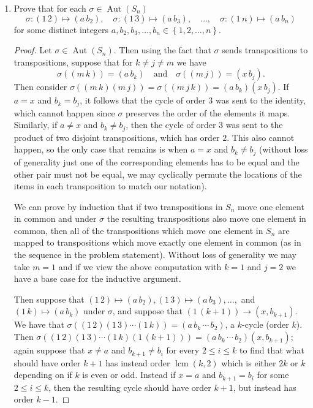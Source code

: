 \documentclass[11pt]{article}
\newcommand{\cbr}[1]{\left\{#1\right\}}
\DeclareMathOperator\Aut{Aut}
\DeclareMathOperator{\lcm}{lcm}
\begin{document}
\begin{enumerate}
\begin{enumerate}[label=(\alph*)]
\begin{proof}
        Thus for $2\leq n \neq 6$, $\abs{\mathcal{K}}\neq \abs{\mathcal{K}^{\prime}}$.

        By (a) any automorphism of $S_n$ must induce a mapping from $\mathcal{K}$ onto a conjugacy class whose elements have order $2$, but because $\abs{\mathcal{K}}\neq \abs{\mathcal{K}^{\prime}}$ for $2\leq n\neq 6$ we have that any automorphism of $S_n$ sends $\mathcal{K}$ to itself; that is, it sends transpositions to transpositions.
      \end{proof}
      \item Prove that for each $\sigma\in \Aut(S_n)$ \[\sigma\colon (1\, 2)\mapsto (a\, b_2), \quad\sigma\colon (1\, 3)\mapsto (a\, b_3), \quad\dots,\quad \sigma\colon (1\, n)\mapsto (a\, b_n)\]
      for some distinct integers $a, b_2, b_3, \dots, b_n\in \cbr{1, 2, \dots, n}$.
      \begin{proof}
        Let $\sigma\in \Aut(S_n)$. Then using the fact that $\sigma$ sends transpositions to transpositions, suppose that for $k \neq j \neq m$ we have \[\sigma((m\, k)) = (a \, b_k)\quad \text{and}\quad \sigma((m\, j)) = (x\, b_j).\] Then consider $\sigma((m\, k)(m\, j)) = \sigma((m\, j \, k)) = (a \, b_k)(x\, b_j)$. If $a = x$ and $b_k = b_j$, it follows that the cycle of order $3$ was sent to the identity, which cannot happen since $\sigma$ preserves the order of the elements it maps. Similarly, if $a\neq x$ and $b_k\neq b_j$, then the cycle of order $3$ was sent to the product of two disjoint transpositions, which has order $2$. This also cannot happen, so the only case that remains is when $a = x$ and $b_k \neq b_j$ (without loss of generality just one of the corresponding elements has to be equal and the other pair must not be equal, we may cyclically permute the locations of the items in each transposition to match our notation).

        We can prove by induction that if two transpositions in $S_n$ move one element in common and under $\sigma$ the resulting transpositions also move one element in common, then all of the transpositions which move one element in $S_n$ are mapped to transpositions which move exactly one element in common (as in the sequence in the problem statement). Without loss of generality we may take $m = 1$ and if we view the above computation with $k =1$ and $j = 2$ we have a base case for the inductive argument.

        Then suppose that $(1\, 2)\mapsto (a\, b_2),  (1\, 3)\mapsto (a\, b_3), \dots, $ and $ (1\, k)\mapsto (a\, b_k)$ under $\sigma$, and suppose that $(1\, (k+1))\to (x, b_{k+1})$. We have that $\sigma((1\, 2)(1\, 3)\cdots (1\, k)) = (a\, b_k \,\cdots \, b_2)$, a $k$-cycle (order $k$). Then $\sigma((1\, 2)(1\, 3)\cdots (1\, k)(1\, (k+1))) = (a\, b_k \,\cdots \, b_2)(x, b_{k+1})$; again suppose that $x\neq a$ and $b_{k+1}\neq b_i$ for every $2\leq i \leq k$ to find that what should have order $k+1$ has instead order $\lcm(k,2)$ which is either $2k$ or $k$ depending on if $k$ is even or odd. Instead if $x = a$ and $b_{k+1} = b_i$ for some $2\leq i \leq k$, then the resulting cycle should have order $k+1$, but instead has order $k-1$.


\end{proof}
\end{enumerate}
\end{enumerate}
\end{document}
